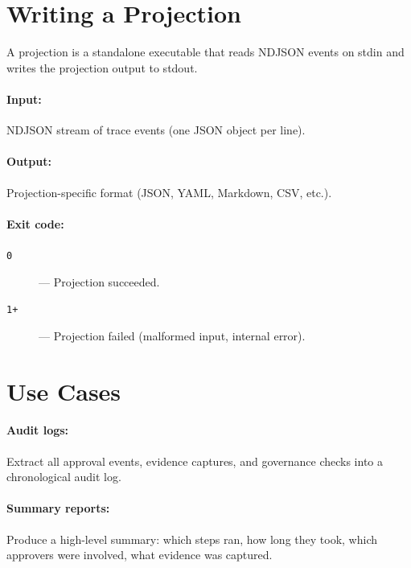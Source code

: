 \section{Writing a Projection}
\label{sec:writing-projection}

A projection is a standalone executable that reads NDJSON events on stdin and
writes the projection output to stdout.

\paragraph{Input:} NDJSON stream of trace events (one JSON object per line).

\paragraph{Output:} Projection-specific format (JSON, YAML, Markdown, CSV, etc.).

\paragraph{Exit code:}
\begin{description}
  \item[\texttt{0}] --- Projection succeeded.
  \item[\texttt{1+}] --- Projection failed (malformed input, internal error).
\end{description}

\section{Use Cases}
\label{sec:projection-use-cases}

\paragraph{Audit logs:}
Extract all approval events, evidence captures, and governance checks into a
chronological audit log.

\paragraph{Summary reports:}
Produce a high-level summary: which steps ran, how long they took, which
approvers were involved, what evidence was captured.

